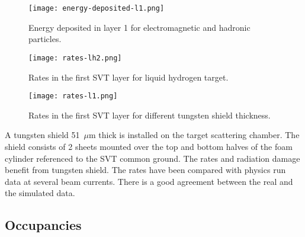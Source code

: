 \begin{figure}[hbt] 
\centering 
\texttt{[image: energy-deposited-l1.png]}
\caption{Energy deposited in layer 1 for electromagnetic and hadronic particles.}
\label{fig:energy-deposited-l1}
\end{figure}

\begin{figure}[hbt] 
\centering 
\texttt{[image: rates-lh2.png]}
\caption{Rates in the first SVT layer for liquid hydrogen target.}
\label{fig:rates-lh2}
\end{figure}

\begin{figure}[hbt] 
\centering 
\texttt{[image: rates-l1.png]}
\caption{Rates in the first SVT layer for different tungsten shield thickness.}
\label{fig:rates-l1}
\end{figure}

A tungsten shield 51~$\mu$m thick is installed on the target scattering chamber. The shield consists of 2 sheets mounted over the top and bottom halves of the foam cylinder referenced to the SVT common ground. The rates and radiation damage benefit from tungsten shield. The rates have been compared with physics run data at several beam currents. There is a good agreement between the real and the simulated data.

\subsection{Occupancies}



